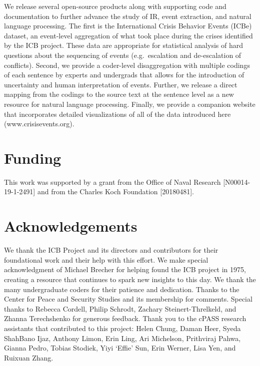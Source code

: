 \documentclass{article}
\begin{document}
We release several open-source products along with supporting code and
documentation to further advance the study of IR, event extraction, and
natural language processing. The first is the International Crisis
Behavior Events (ICBe) dataset, an event-level aggregation of what took
place during the crises identified by the ICB project. These data are
appropriate for statistical analysis of hard questions about the
sequencing of events (e.g.~escalation and de-escalation of conflicts).
Second, we provide a coder-level disaggregation with multiple codings of
each sentence by experts and undergrads that allows for the introduction
of uncertainty and human interpretation of events. Further, we release a
direct mapping from the codings to the source text at the sentence level
as a new resource for natural language processing. Finally, we provide a
companion website that incorporates detailed visualizations of all of
the data introduced here (www.crisisevents.org).

\hypertarget{funding}{%
\section{Funding}\label{funding}}

This work was supported by a grant from the Office of Naval Research
{[}N00014-19-1-2491{]} and from the Charles Koch Foundation
{[}20180481{]}.

\hypertarget{acknowledgements}{%
\section{Acknowledgements}\label{acknowledgements}}

We thank the ICB Project and its directors and contributors for their
foundational work and their help with this effort. We make special
acknowledgment of Michael Brecher for helping found the ICB project in
1975, creating a resource that continues to spark new insights to this
day. We thank the many undergraduate coders for their patience and
dedication. Thanks to the Center for Peace and Security Studies and its
membership for comments. Special thanks to Rebecca Cordell, Philip
Schrodt, Zachary Steinert-Threlkeld, and Zhanna Terechshenko for
generous feedback. Thank you to the cPASS research assistants that
contributed to this project: Helen Chung, Daman Heer, Syeda ShahBano
Ijaz, Anthony Limon, Erin Ling, Ari Michelson, Prithviraj Pahwa, Gianna
Pedro, Tobias Stodiek, Yiyi `Effie' Sun, Erin Werner, Lisa Yen, and
Ruixuan Zhang.
\end{document}

